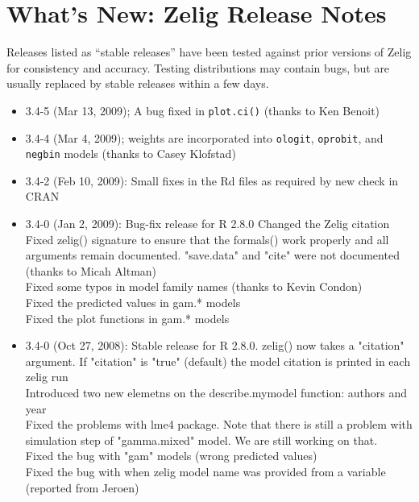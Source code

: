 
\section{What's New:  Zelig Release Notes}\label{release.notes}

Releases listed as ``stable releases'' have been tested against prior
versions of Zelig for consistency and accuracy.  Testing distributions
may contain bugs, but are usually replaced by stable releases within a
few days. 

\begin{itemize} 

\item {3.4-5} (Mar 13, 2009); A bug fixed in {\tt plot.ci()} (thanks to Ken Benoit) \\

\item {3.4-4} (Mar 4, 2009); weights are incorporated into {\tt ologit}, {\tt oprobit}, and {\tt negbin} models (thanks to Casey Klofstad) \\

\item {3.4-2} (Feb 10, 2009): Small fixes in the Rd files as required 
by new check in CRAN \\

\item {3.4-0} (Jan 2, 2009): Bug-fix release for R 2.8.0
Changed the Zelig citation \\
Fixed zelig() signature to ensure that the formals() work properly 
and all arguments remain documented. "save.data" and "cite" were not 
documented (thanks to Micah Altman)\\
Fixed some typos in model family names (thanks to Kevin Condon)\\
Fixed the predicted values in gam.* models \\
Fixed the plot functions in gam.* models \\

\item {3.4-0} (Oct 27, 2008): Stable release for R 2.8.0.
zelig() now takes a "citation" argument. If "citation" is "true" (default)
the model citation is printed in each zelig run \\
Introduced two new elemetns on the describe.mymodel function: authors and year \\
Fixed the problems with lme4 package. Note that there is still a problem with 
simulation step of "gamma.mixed" model. We are still working on that. \\
Fixed the bug with "gam" models (wrong predicted values) \\
Fixed the bug with when zelig model name was provided from a variable (reported from 
Jeroen)


\end{itemize}
